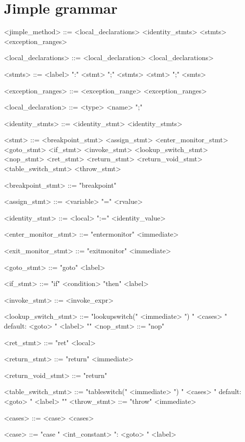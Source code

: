 \documentclass{report}
\begin{document}



\appendix

\section{Jimple grammar}
\begin{grammar}
<jimple_method> ::= <local_declarations> <identity_stmts> <stmts> <exception_ranges>

<local_declarations> ::= <local_declaration> <local_declarations>

<stmts> ::= <label> ":" <stmt> ";" <stmts> \alt  <stmt> ";" <smts>

<exception_ranges> ::= <exception_range> <exception_ranges>

<local_declaration> ::= <type> <name> ";"

<identity_stmts> ::= <identity_stmt> <identity_stmts>

<stmt> ::= <breakpoint_stmt> \alt <assign_stmt> \alt <enter_monitor_stmt>
<goto_stmt> \alt <if_stmt> \alt <invoke_stmt> \alt <lookup_switch_stmt> \alt <nop_stmt> \alt <ret_stmt> \alt <return_stmt> \alt <return_void_stmt> \alt <table_switch_stmt> \alt <throw_stmt>

<breakpoint_stmt> ::= "breakpoint"

<assign_stmt> ::= <variable> "=" <rvalue>

<identity_stmt> ::= <local> ":=" <identity_value>

<enter_monitor_stmt> ::= "entermonitor" <immediate>

<exit_monitor_stmt> ::= "exitmonitor" <immediate>

<goto_stmt> ::= "goto" <label>

<if_stmt> ::= "if" <condition> "then" <label>

<invoke_stmt> ::= <invoke_expr>

<lookup_switch_stmt> ::= "lookupswitch(" <immediate> ") {" <cases> " default: <goto> " <label> "}" <nop_stmt> ::= "nop"

<ret_stmt> ::= "ret" <local>

<return_stmt> ::= "return" <immediate>

<return_void_stmt> ::= "return" 

<table_switch_stmt> ::= "tableswitch(" <immediate> ") {" <cases> " default: <goto> " <label> "}" <throw_stmt> ::= "throw" <immediate>

<cases> ::= <case> <cases>

<case> ::= "case " <int_constant> ": <goto> " <label>


\end{grammar}
\end{document}
